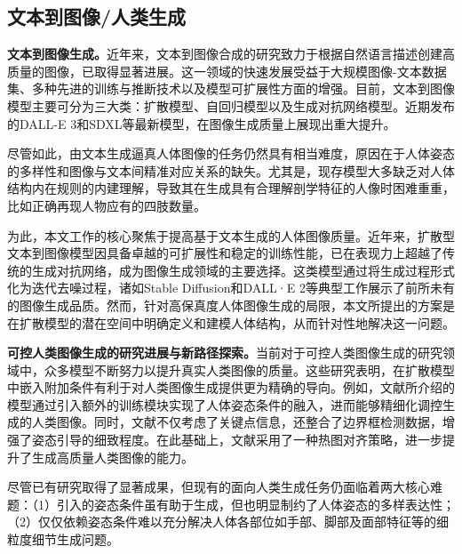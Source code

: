 \subsection{文本到图像/人类生成}

\textbf{文本到图像生成。}近年来，文本到图像合成的研究致力于根据自然语言描述创建高质量的图像，已取得显著进展。这一领域的快速发展受益于大规模图像-文本数据集\cite{kakaobrain2022coyo_700m, schuhmann2022laion}、多种先进的训练与推断技术\cite{NEURIPS2020_4c5bcfec, song2020denoising, ho2022cascaded}以及模型可扩展性方面的增强\cite{DALLE_2}。目前，文本到图像模型主要可分为三大类：扩散模型\cite{balaji2022ediffi, DALLE_2, GLIDE, saharia2022photorealistic, gafni2022make, stablediffusion, Imagen_saharia2022photorealistic}、自回归模型\cite{ramesh2021zero, yu2022scaling, chang2023muse}以及生成对抗网络模型\cite{sauer2023stylegan, kang2023scaling, zhang2022exploringGAN}。近期发布的DALL-E 3\cite{openai2023dalle3}和SDXL\cite{SDXL}等最新模型，在图像生成质量上展现出重大提升。

尽管如此，由文本生成逼真人体图像的任务仍然具有相当难度，原因在于人体姿态的多样性和图像与文本间精准对应关系的缺失。尤其是，现存模型大多缺乏对人体结构内在规则的内建理解，导致其在生成具有合理解剖学特征的人像时困难重重，比如正确再现人物应有的四肢数量。

为此，本文工作的核心聚焦于提高基于文本生成的人体图像质量。近年来，扩散型文本到图像模型因具备卓越的可扩展性和稳定的训练性能，已在表现力上超越了传统的生成对抗网络\cite{dhariwal2021diffusion}，成为图像生成领域的主要选择\cite{nichol2021glide, saharia2022photorealistic, balaji2022ediffi, li2023snapfusion}。这类模型通过将生成过程形式化为迭代去噪过程\cite{ho2020denoising}，诸如Stable Diffusion\cite{Rombach_2022_CVPR}和DALL·E 2\cite{ramesh2022hierarchical}等典型工作展示了前所未有的图像生成品质。然而，针对高保真度人体图像生成的局限，本文所提出的方案是在扩散模型的潜在空间中明确定义和建模人体结构，从而针对性地解决这一问题。

\textbf{可控人类图像生成的研究进展与新路径探索。}当前对于可控人类图像生成的研究领域中，众多模型不断努力以提升真实人类图像的质量。这些研究表明，在扩散模型中嵌入附加条件有利于对人类图像生成提供更为精确的导向。例如，文献\cite{controlnet, t2i_adapter, huang2023composer}所介绍的模型通过引入额外的训练模块实现了人体姿态条件的融入，进而能够精细化调控生成的人类图像。同时，文献\cite{li2023gligen}不仅考虑了关键点信息，还整合了边界框检测数据，增强了姿态引导的细致程度。在此基础上，文献\cite{ju2023humansd}采用了一种热图对齐策略，进一步提升了生成高质量人类图像的能力。

尽管已有研究取得了显著成果，但现有的面向人类生成任务仍面临着两大核心难题：（1）引入的姿态条件虽有助于生成，但也明显制约了人体姿态的多样表达性；（2）仅仅依赖姿态条件难以充分解决人体各部位如手部、脚部及面部特征等的细粒度细节生成问题。


